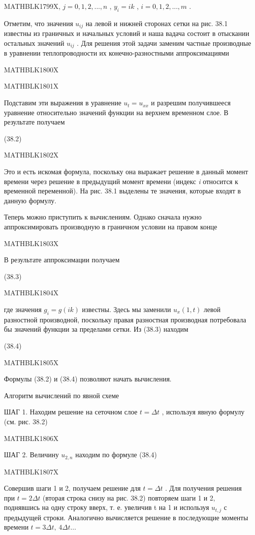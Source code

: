 \documentclass[
]{article}
\begin{document}
{{{MATHBLK1799X, \(j = 0, 1, 2, ..., n\) , \(y_i = ik\) ,
\(i = 0, 1, 2, ..., m\) .

Отметим, что значения \(u_{ij}\) на левой и нижней сторонах сетки на
рис. 38.1 известны из граничных и начальных условий и наша вадача
состоит в отыскании остальных значений \(u_{ij}\) . Для решения этой
задачи заменим частные производные в уравнении теплопроводности их
конечно-разностными аппроксимациями

MATHBLK1800X

MATHBLK1801X

Подставим эти выражения в уравнение \(u_t = u_{xx}\) и разрешим
получившееся уравнение относительно значений функции на верхнем
временном слое. В результате получаем

(38.2)

MATHBLK1802X

Это и есть искомая формула, поскольку она выражает решение в данный
момент времени через решение в предыдущий момент времени (индекс
\emph{i} относится к временной переменной). На рис. 38.1 выделены те
значения, которые входят в данную формулу.

Теперь можно приступить к вычислениям. Однако сначала нужно
аппроксимировать производную в граничном условии на правом конце

MATHBLK1803X

В результате аппроксимации получаем

(38.3)

MATHBLK1804X

где значения \(g_i = g(ik)\) известны. Здесь мы заменили \(u_x(1, t)\)
левой разностной производной, поскольку правая разностная производная
потребовала бы значений функции за пределами сетки. Из (38.3) находим

(38.4)

MATHBLK1805X

Формулы (38.2) и (38.4) позволяют начать вычисления.

Алгоритм вычислений по явной схеме

ШАГ 1. Находим решение на сеточном слое \(t = \Delta t\) , используя
явную формулу (см. рис. 38.2)

MATHBLK1806X

ШАГ 2. Величину \(u_{2,n}\) находим по формуле (38.4)

MATHBLK1807X

Совершив шаги 1 и 2, получаем решение для \(t=\Delta t\) . Для получения
решения при \(t=2\Delta t\) (вторая строка снизу на рис. 38.2) повторяем
шаги 1 и 2, поднявшись на одну строку вверх, т. е. увеличив t на 1 и
используя \(u_{t,j}\) с предыдущей строки. Аналогично вычисляется
решение в последующие моменты времени \(t=3\Delta t,\ 4\Delta t\dots\)

}}}
\end{document}
